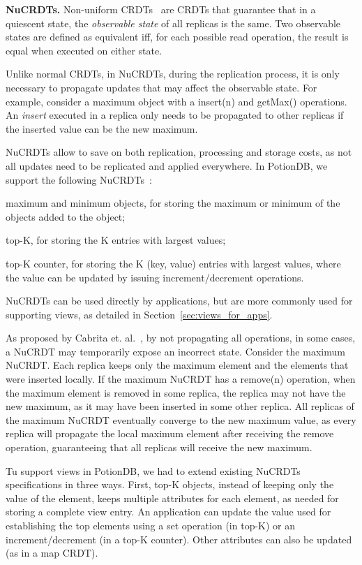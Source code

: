 \documentclass[sigplan,twocolumn,review,anonymous]{acmart}
\newcommand{\code}[1]{\textsf{\small{#1}}}
\newcommand{\nuno}[1]{\nbnote{Nuno}{red}{#1}}
\begin{document}
\noindent
\textbf{NuCRDTs.} Non-uniform CRDTs~\cite{Cabrita17Nonuniform} are CRDTs that guarantee that in a quiescent state, 
the \emph{observable state} of all replicas is the same. 
Two observable states are defined as equivalent iff, for each possible read operation, the result is equal when executed on either state.

Unlike normal CRDTs, in NuCRDTs, during the replication process, it is only necessary to propagate
updates that may affect the observable state. For example, consider a maximum object with a \code{insert(n)} and 
\code{getMax()} operations. An \emph{insert} executed in a replica only needs to be propagated 
to other replicas if the inserted value can be the new maximum. 

NuCRDTs allow to save on both replication, processing and storage costs, as not all updates need 
to be replicated and applied everywhere.
In PotionDB, we support the following NuCRDTs~\cite{Cabrita17Nonuniform}: 
\begin{inparaenum}[(i)]
\item maximum and minimum objects, for storing the maximum or minimum of the objects added to the object;
\item top-K, for storing the K entries with largest values;
\item top-K counter, for storing the K (key, value) entries with largest values, where the value
can be updated by issuing increment/decrement operations.
\end{inparaenum}
NuCRDTs can be used directly by applications, but are more commonly used for supporting 
views, as detailed in Section~\ref{sec:views_for_apps}.

\nuno{Dar mais detalhes de como funcionam?}

As proposed by Cabrita et. al.~\cite{Cabrita17Nonuniform}, by not propagating all operations, in some cases, 
a NuCRDT may temporarily expose an incorrect state.
Consider the maximum NuCRDT. Each replica keeps only the maximum element and 
the elements that were inserted locally. If the maximum NuCRDT has a \code{remove(n)} operation,
when the maximum element is removed in some replica, the replica may not have the new maximum,
as it may have been inserted in some other replica.  
All replicas of the maximum NuCRDT eventually 
converge to the new maximum value, as every replica will propagate the local maximum element after receiving the 
remove operation, guaranteeing that all replicas will receive the new maximum.

Tu support views in PotionDB, we had to extend existing NuCRDTs specifications
in three ways.
First, top-K objects, instead of keeping only the value of the element,  keeps multiple
attributes for each element, as needed for storing a complete view entry. An application can update
the value used for establishing the top elements using a set operation (in top-K) or an increment/decrement 
(in a top-K counter). Other attributes can also be updated (as in a map CRDT). %
\end{document}
